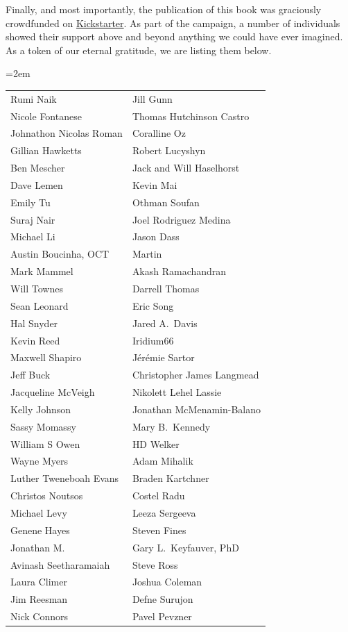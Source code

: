 Finally, and most importantly, the publication of this book was graciously crowdfunded on \href{https://www.kickstarter.com/projects/phillipcompeau/biological-modeling-a-short-tour?ref=user_menu}{Kickstarter}. As part of the campaign, a number of individuals showed their support above and beyond anything we could have ever imagined. As a token of our eternal gratitude, we are listing them below.
\begin{center}
\tabcolsep=2em
\begin{tabular}{l l}
Rumi Naik & Jill Gunn\\
Nicole Fontanese & Thomas Hutchinson Castro\\
Johnathon Nicolas Roman & Coralline Oz\\
Gillian Hawketts & Robert Lucyshyn\\
Ben Mescher & Jack and Will Haselhorst\\
Dave Lemen & Kevin Mai\\
Emily Tu & Othman Soufan\\
Suraj Nair & Joel Rodriguez Medina\\
Michael Li & Jason Dass\\
Austin Boucinha, OCT & Martin\\
Mark Mammel & Akash Ramachandran\\
Will Townes & Darrell Thomas\\
Sean Leonard & Eric Song\\
Hal Snyder & Jared A.~Davis\\
Kevin Reed & Iridium66\\
Maxwell Shapiro & Jérémie Sartor\\
Jeff Buck & Christopher James Langmead\\
Jacqueline McVeigh & Nikolett Lehel Lassie\\
Kelly Johnson & Jonathan McMenamin-Balano\\
Sassy Momassy & Mary B.~Kennedy\\
William S Owen & HD Welker\\
Wayne Myers & Adam Mihalik\\
Luther Tweneboah Evans & Braden Kartchner\\
Christos Noutsos & Costel Radu\\
Michael Levy & Leeza Sergeeva\\
Genene Hayes & Steven Fines\\
Jonathan M. & Gary L.~Keyfauver, PhD\\
Avinash Seetharamaiah & Steve Ross\\
Laura Climer & Joshua Coleman\\
Jim Reesman & Defne Surujon\\
Nick Connors & Pavel Pevzner\\
\end{tabular}
\end{center}


